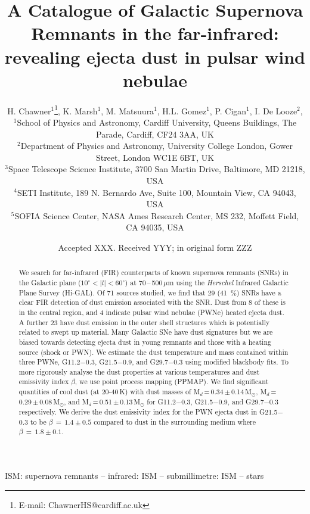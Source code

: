 \documentclass[fleqn,usenatbib]{mnras}
\title[Dusty Supernova remnants]{A Catalogue of Galactic Supernova Remnants in the far-infrared: revealing ejecta dust in pulsar wind nebulae}
\author[H. Chawner et al.]{
H. Chawner$^{1}$\thanks{E-mail: ChawnerHS@cardiff.ac.uk},
K. Marsh$^{1}$,
M. Matsuura$^{1}$,
H.L. Gomez$^{1}$,
P. Cigan$^{1}$,
I. De Looze$^{2}$,
\newauthor{
M. J. Barlow$^{2}$,
L. Dunne$^{1}$
A. Noriega-Crespo$^{3}$,
and J. Rho$^{4,5}$}
\\
$^{1}$School of Physics and Astronomy, Cardiff University, Queens Buildings, The Parade, Cardiff, CF24 3AA, UK\\
$^{2}$Department of Physics and Astronomy, University College London, Gower Street, London WC1E 6BT, UK\\
$^{3}$Space Telescope Science Institute, 3700 San Martin Drive, Baltimore, MD 21218, USA\\
$^{4}$SETI Institute, 189 N. Bernardo Ave, Suite 100, Mountain View, CA 94043, USA\\
$^{5}$SOFIA Science Center, NASA Ames Research Center, MS 232, Moffett Field, CA 94035, USA
}
\date{Accepted XXX. Received YYY; in original form ZZZ}
\newcommand\PPMAPMassa{0.34}
\newcommand\PPMAPMassErra{0.14}
\newcommand\PPMAPMassb{0.29}
\newcommand\PPMAPMassErrb{0.08}
\newcommand\PPMAPMassc{0.51}
\newcommand\PPMAPMassErrc{0.13}
\newcommand\numStudied{71 }		%
\newcommand\percOne{41 } 		%
\newcommand\numOne{29 }			%
\newcommand\numPWNd{4 }			%
\newcommand\numShell{23 }		%
\newcommand\numCentral{8 }		%
\begin{document}
\label{firstpage}
\pagerange{\pageref{firstpage}--\pageref{lastpage}}
\maketitle


\begin{abstract}
We search for far-infrared (FIR) counterparts of known supernova remnants (SNRs) in the Galactic plane ($10^{\circ}< \mid l \mid <60^{\circ}$) at 70\,--\,500\,$\mu$m using the \textit{Herschel} Infrared Galactic Plane Survey (Hi-GAL). Of \numStudied sources studied, we find that \numOne (\percOne\,\%) SNRs have a clear FIR detection of dust emission associated with the SNR. Dust from \numCentral of these is in the central region, and \numPWNd indicate pulsar wind nebulae (PWNe) heated ejecta dust. A further \numShell have dust emission in the outer shell structures which is potentially related to swept up material. Many Galactic SNe have dust signatures but we are biased towards detecting ejecta dust in young remnants and those with a heating source (shock or PWN). We estimate the dust temperature and mass contained within three PWNe, G11.2$-$0.3, G21.5$-$0.9, and G29.7$-$0.3 using modified blackbody fits. To more rigorously analyse the dust properties at various temperatures and dust emissivity index $\beta$, we use point process mapping (PPMAP). We find significant quantities of cool dust (at 20-40\,K) with dust masses of M$_d$\,=\,\PPMAPMassa\,$\pm$\,\PPMAPMassErra\,M$_\odot$, M$_d$\,=\,\PPMAPMassb\,$\pm$\,\PPMAPMassErrb\,M$_\odot$, and M$_d$\,=\,\PPMAPMassc\,$\pm$\,\PPMAPMassErrc\,M$_\odot$ for G11.2$-$0.3, G21.5$-$0.9, and G29.7$-$0.3 respectively. We derive the dust emissivity index for the PWN ejecta dust in G21.5$-$0.3 to be $\beta\,=\,1.4 \pm 0.5$ compared to dust in the surrounding medium where $\beta\,=\,1.8 \pm 0.1$.

\end{abstract}

\begin{keywords}
ISM: supernova remnants -- infrared: ISM -- submillimetre: ISM -- stars
\end{keywords}



\end{document}
